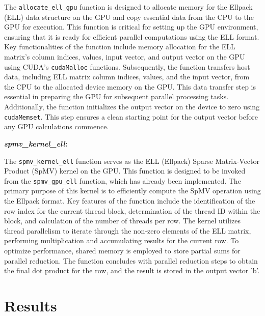 \documentclass[11pt, twocolumn]{article}
\begin{document}
The \texttt{allocate\_ell\_gpu} function is designed to allocate memory for the Ellpack (ELL) data structure on the GPU and copy essential data from the CPU to the GPU for execution. This function is critical for setting up the GPU environment, ensuring that it is ready for efficient parallel computations using the ELL format. Key functionalities of the function include memory allocation for the ELL matrix's column indices, values, input vector, and output vector on the GPU using CUDA's \texttt{cudaMalloc} functions. Subsequently, the function transfers host data, including ELL matrix column indices, values, and the input vector, from the CPU to the allocated device memory on the GPU. This data transfer step is essential in preparing the GPU for subsequent parallel processing tasks. Additionally, the function initializes the output vector on the device to zero using \texttt{cudaMemset}. This step ensures a clean starting point for the output vector before any GPU calculations commence.

\textbf{\textit{spmv\_kernel\_ell}:}

The \texttt{spmv\_kernel\_ell} function serves as the ELL (Ellpack) Sparse Matrix-Vector Product (SpMV) kernel on the GPU. This function is designed to be invoked from the \texttt{spmv\_gpu\_ell} function, which has already been implemented. The primary purpose of this kernel is to efficiently compute the SpMV operation using the Ellpack format. Key features of the function include the identification of the row index for the current thread block, determination of the thread ID within the block, and calculation of the number of threads per row. The kernel utilizes thread parallelism to iterate through the non-zero elements of the ELL matrix, performing multiplication and accumulating results for the current row. To optimize performance, shared memory is employed to store partial sums for parallel reduction. The function concludes with parallel reduction steps to obtain the final dot product for the row, and the result is stored in the output vector 'b'.

\section{Results}
\end{document}
